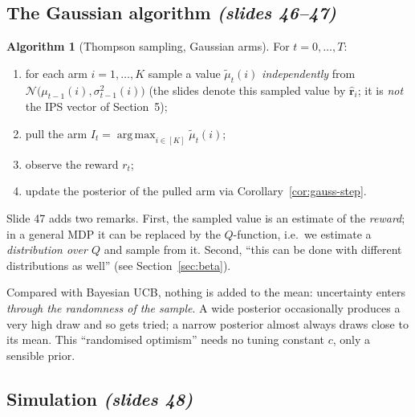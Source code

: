 \documentclass[11pt,a4paper]{article}
\newcommand{\Norm}{\mathcal{N}}
\DeclareMathOperator*{\argmax}{arg\,max}
\newcommand{\slides}[1]{\emph{(slides #1)}}
\theoremstyle{plain}
\theoremstyle{definition}
\newtheorem{algorithm}[theorem]{Algorithm}
\theoremstyle{remark}
\begin{document}
\subsection{The Gaussian algorithm \slides{46--47}}

\begin{algorithm}[Thompson sampling, Gaussian arms]\label{alg:tsg}
For $t=0,\dots,T$:
\begin{enumerate}
 \item for each arm $i=1,\dots,K$ sample a value $\tilde\mu_t(i)$ \emph{independently} from $\Norm\bigl(\mu_{t-1}(i),\sigma^2_{t-1}(i)\bigr)$ (the slides denote this sampled value by $\hat{\mathbf r}_i$; it is \emph{not} the IPS vector of Section~5);
 \item pull the arm $I_t=\argmax_{i\in[K]}\tilde\mu_t(i)$;
 \item observe the reward $r_t$;
 \item update the posterior of the pulled arm via Corollary~\ref{cor:gauss-step}.
\end{enumerate}
\end{algorithm}

Slide 47 adds two remarks. First, the sampled value is an estimate of the \emph{reward}; in a general MDP it can be replaced by the $Q$-function, i.e.\ we estimate a \emph{distribution over $Q$} and sample from it.
Second, ``this can be done with different distributions as well'' (see Section~\ref{sec:beta}).

\begin{intuition}
Compared with Bayesian UCB, nothing is added to the mean: uncertainty enters \emph{through the randomness of the sample}. A wide posterior occasionally produces a very high draw and so gets tried; a narrow posterior almost always draws close to its mean. This ``randomised optimism''
needs no tuning constant $c$, only a sensible prior.
\end{intuition}

\subsection{Simulation \slides{48}}
\end{document}

